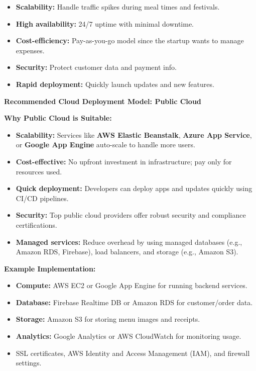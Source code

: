 \documentclass[12pt]{article}
\begin{document}
\begin{itemize}
\item
  \textbf{Scalability:} Handle traffic spikes during meal times and
  festivals.
\item
  \textbf{High availability:} 24/7 uptime with minimal downtime.
\item
  \textbf{Cost-efficiency:} Pay-as-you-go model since the startup wants
  to manage expenses.
\item
  \textbf{Security:} Protect customer data and payment info.
\item
  \textbf{Rapid deployment:} Quickly launch updates and new features.
\end{itemize}

\textbf{Recommended Cloud Deployment Model: Public Cloud}

\textbf{Why Public Cloud is Suitable:}

\begin{itemize}
\item
  \textbf{Scalability:} Services like \textbf{AWS Elastic Beanstalk},
  \textbf{Azure App Service}, or \textbf{Google App Engine} auto-scale
  to handle more users.
\item
  \textbf{Cost-effective:} No upfront investment in infrastructure; pay
  only for resources used.
\item
  \textbf{Quick deployment:} Developers can deploy apps and updates
  quickly using CI/CD pipelines.
\item
  \textbf{Security:} Top public cloud providers offer robust security
  and compliance certifications.
\item
  \textbf{Managed services:} Reduce overhead by using managed databases
  (e.g., Amazon RDS, Firebase), load balancers, and storage (e.g.,
  Amazon S3).
\end{itemize}

\textbf{Example Implementation:}

\begin{itemize}
\item
  \textbf{Compute:} AWS EC2 or Google App Engine for running backend
  services.
\item
  \textbf{Database:} Firebase Realtime DB or Amazon RDS for
  customer/order data.
\item
  \textbf{Storage:} Amazon S3 for storing menu images and receipts.
\item
  \textbf{Analytics:} Google Analytics or AWS CloudWatch for monitoring
  usage.
\item
  SSL certificates, AWS Identity and Access Management (IAM), and
  firewall settings.
\end{itemize}
\end{document}
